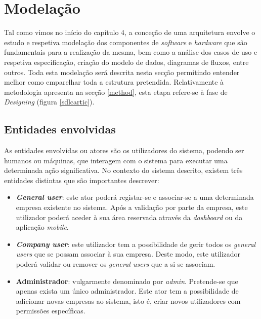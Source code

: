 






\section{Modelação}

Tal como vimos no início do capítulo 4, a conceção de uma arquitetura envolve o estudo e respetiva modelação dos componentes de \textit{software} e \textit{hardware} que são fundamentais para a realização da mesma, bem como a análise dos casos de uso e respetiva especificação, criação do modelo de dados, diagramas de fluxos, entre outros. Toda esta modelação será descrita nesta secção permitindo entender melhor como emparelhar toda a estrutura pretendida. Relativamente à metodologia apresenta na secção \ref{method}, esta etapa refere-se à fase de \textit{Designing} (figura \ref{sdlcartic}). 






\subsection{Entidades envolvidas}

As entidades envolvidas ou atores são os utilizadores do sistema, podendo ser humanos ou máquinas, que interagem com o sistema para executar uma determinada ação significativa. No contexto do sistema descrito, existem três entidades distintas que são importantes descrever: 

\begin{itemize}
	
	\item \textbf{\textit{General user}}: este ator poderá registar-se e associar-se a uma determinada empresa existente no sistema. Após a validação por parte da empresa, este utilizador poderá aceder à sua área reservada através da \textit{dashboard} ou da aplicação \textit{mobile}. 
	
	\item \textbf{\textit{Company user}}: este utilizador tem a possibilidade de gerir todos os \textit{general users} que se possam associar à sua empresa. Deste modo, este utilizador poderá validar ou remover os \textit{general users} que a si se associam. 
	
	\item \textbf{Administrador}: vulgarmente denominado por \textit{admin}. Pretende-se que apenas exista um único administrador. Este ator tem a possibilidade de adicionar novas empresas ao sistema, isto é, criar novos utilizadores com permissões específicas. 
	
\end{itemize}




